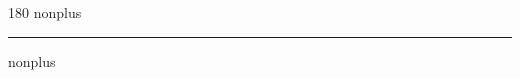 
\begin{frame}
\begin{center}
\begin{turn}{180}
{\fontsize{2.5cm}{1em}\selectfont nonplus}
\end{turn}
\vspace{1em}\par  
\hrule
\vspace{1em}\par  
{\fontsize{2.5cm}{1em}\selectfont nonplus}
\end{center}
\end{frame}
